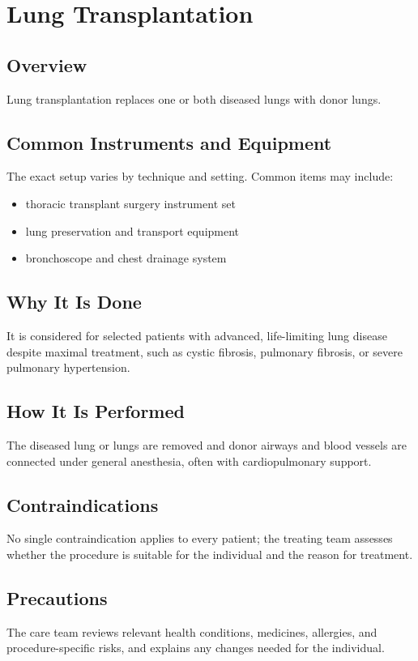 \chapter{Lung Transplantation}
\section*{Overview}
Lung transplantation replaces one or both diseased lungs with donor lungs.
\section*{Common Instruments and Equipment}
The exact setup varies by technique and setting. Common items may include:
\begin{itemize}[nosep,leftmargin=*]
  \item thoracic transplant surgery instrument set
  \item lung preservation and transport equipment
  \item bronchoscope and chest drainage system
\end{itemize}

\section*{Why It Is Done}
It is considered for selected patients with advanced, life-limiting lung disease despite maximal treatment, such as cystic fibrosis, pulmonary fibrosis, or severe pulmonary hypertension.
\section*{How It Is Performed}
The diseased lung or lungs are removed and donor airways and blood vessels are connected under general anesthesia, often with cardiopulmonary support.
\section*{Contraindications}
No single contraindication applies to every patient; the treating team assesses whether the procedure is suitable for the individual and the reason for treatment.

\section*{Precautions}
The care team reviews relevant health conditions, medicines, allergies, and procedure-specific risks, and explains any changes needed for the individual.

